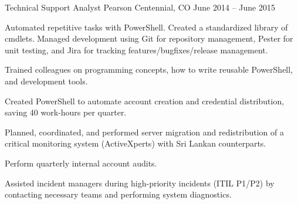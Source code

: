 \cventry
{Technical Support Analyst} %
{Pearson} %
{Centennial, CO} %
{June 2014 – June 2015} %
{
  	\begin{cvitems} %
        \item {Automated repetitive tasks with PowerShell. Created a standardized library of cmdlets. Managed development using Git for repository management, Pester for unit testing, and Jira for tracking features/bugfixes/release management.}
		\item {Trained colleagues on programming concepts, how to write reusable PowerShell, and development tools.}
		\item {Created PowerShell to automate account creation and credential distribution, saving 40 work-hours per quarter.}
		\item {Planned, coordinated, and performed server migration and redistribution of a critical monitoring system (ActiveXperts) with Sri Lankan counterparts.}
		\item {Perform quarterly internal account audits.}
		\item {Assisted incident managers during high-priority incidents (ITIL P1/P2) by contacting necessary teams and performing system diagnostics.}
	\end{cvitems}
}
